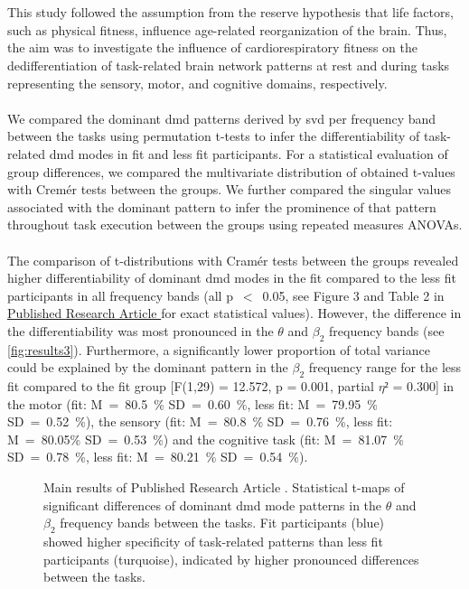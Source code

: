 \hyperref[pub:paperIII]{}\\
\\
This study followed the assumption from the reserve hypothesis that life factors, such as physical fitness, influence age-related reorganization of the brain. Thus, the aim was to investigate the influence of cardiorespiratory fitness on the dedifferentiation of task-related brain network patterns at rest and during tasks representing the sensory, motor, and cognitive domains, respectively.\\
\\
We compared the dominant \gls{dmd} patterns derived by \gls{svd} per frequency band between the tasks using permutation t-tests to infer the differentiability of task-related \gls{dmd} modes in fit and less fit participants. For a statistical evaluation of group differences, we compared the multivariate distribution of obtained t-values with Cremér tests between the groups. We further compared the singular values associated with the dominant pattern to infer the prominence of that pattern throughout task execution between the groups using repeated measures ANOVAs.\\
\\
The comparison of t-distributions with Cramér tests between the groups revealed higher differentiability of dominant \gls{dmd} modes in the fit compared to the less fit participants in all frequency bands (all p~$<$~0.05, see Figure 3 and Table 2 in \hyperref[pub:paperIII]{Published Research Article } for exact statistical values). However, the difference in the differentiability was most pronounced in the $\theta$ and $\beta_2$ frequency bands (see \autoref{fig:results3}). Furthermore, a significantly lower proportion of total variance could be explained by the dominant pattern in the $\beta_2$ frequency range for the less fit compared to the fit group [F(1,29) = 12.572, p = 0.001, partial $\eta²$ = 0.300] in the motor (fit: M~=~80.5~\% SD~=~0.60~\%, less fit: M~=~79.95~\% SD~=~0.52~\%), the sensory (fit: M~=~80.8~\% SD~=~0.76~\%, less fit: M~=~80.05\% SD~=~0.53~\%) and the cognitive task (fit: M~=~81.07~\% SD~=~0.78~\%, less fit: M~=~80.21~\% SD~=~0.54~\%).\\

\begin{figure}[ht]
    \centering
    
    \caption[Main results of Published Research Article ]{Main results of Published Research Article . Statistical t-maps of significant differences of dominant \gls{dmd} mode patterns in the $\theta$ and $\beta_2$ frequency bands between the tasks. Fit participants (blue) showed higher specificity of task-related patterns than less fit participants (turquoise), indicated by higher pronounced differences between the tasks.}
    \label{fig:results3}
\end{figure}

